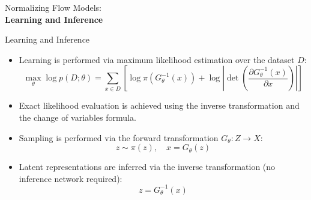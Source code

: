 \begin{frame}[allowframebreaks]{}
    \LARGE Normalizing Flow Models: \\[1.5ex] \textbf{Learning and Inference}
\end{frame}

\begin{frame}{Learning and Inference}
\begin{itemize}
    \item Learning is performed via maximum likelihood estimation over the dataset $D$:
    $$
    \max_\theta \log p(D;\theta) = \sum_{x \in D} \left[ \log \pi(G_\theta^{-1}(x)) + \log \left| \det \left( \frac{\partial G_\theta^{-1}(x)}{\partial x} \right) \right| \right]
    $$
    \item Exact likelihood evaluation is achieved using the inverse transformation and the change of variables formula.
    \item Sampling is performed via the forward transformation $G_\theta : Z \rightarrow X$:
    $$
    z \sim \pi(z), \quad x = G_\theta(z)
    $$
    \item Latent representations are inferred via the inverse transformation (no inference network required):
    $$
    z = G_\theta^{-1}(x)
    $$
\end{itemize}
\end{frame}